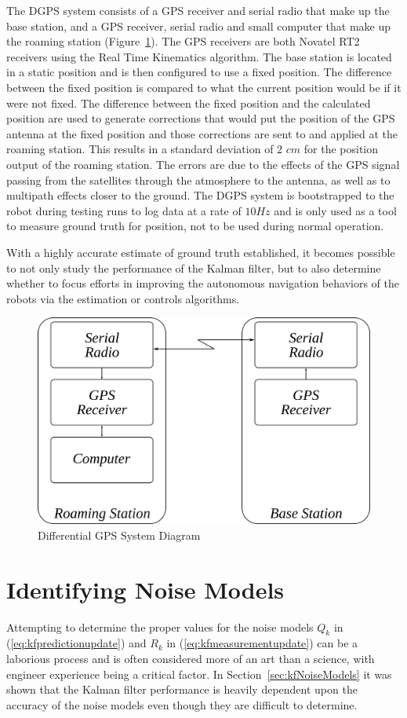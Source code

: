 The DGPS system consists of a GPS receiver and serial radio that make up the base station, and a GPS receiver, serial radio and small computer that make up the roaming station (Figure~\ref{fig:dgps}).
The GPS receivers are both Novatel RT2 receivers using the Real Time Kinematics algorithm.
The base station is located in a static position and is then configured to use a fixed position.
The difference between the fixed position is compared to what the current position would be if it were not fixed.
The difference between the fixed position and the calculated position are used to generate corrections that would put the position of the GPS antenna at the fixed position and those corrections are sent to and applied at the roaming station.
This results in a standard deviation of $2$ $cm$ for the position output of the roaming station.
The errors are due to the effects of the GPS signal passing from the satellites through the atmosphere to the antenna, as well as to multipath effects closer to the ground.
The DGPS system is bootstrapped to the robot during testing runs to log data at a rate of $10 Hz$ and is only used as a tool to measure ground truth for position, not to be used during normal operation.

With a highly accurate estimate of ground truth established, it becomes possible to not only study the performance of the Kalman filter, but to also determine whether to focus efforts in improving the autonomous navigation behaviors of the robots via the estimation or controls algorithms.

\begin{figure}[ht!]
\centering
\includegraphics[width=.6\textwidth]{images/dgps}
\caption{Differential GPS System Diagram}%
\label{fig:dgps}
\end{figure}

\section{Identifying Noise Models}%
\label{sec:kfIdentifyNoiseModels}
Attempting to determine the proper values for the noise models $Q_k$ in (\ref{eq:kfpredictionupdate}) and $R_k$ in (\ref{eq:kfmeasurementupdate}) can be a laborious process and is often considered more of an art than a science, with engineer experience being a critical factor.
In Section~\ref{sec:kfNoiseModels} it was shown that the Kalman filter performance is heavily dependent upon the accuracy of the noise models even though they are difficult to determine.

